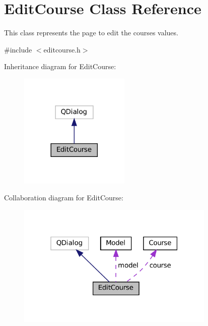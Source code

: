 \hypertarget{classEditCourse}{}\section{Edit\+Course Class Reference}
\label{classEditCourse}


This class represents the page to edit the course\textquotesingle{}s values.  




{\ttfamily \#include $<$editcourse.\+h$>$}



Inheritance diagram for Edit\+Course\+:\nopagebreak
\begin{figure}[H]
\begin{center}
\leavevmode
\includegraphics[width=149pt]{classEditCourse__inherit__graph}
\end{center}
\end{figure}


Collaboration diagram for Edit\+Course\+:\nopagebreak
\begin{figure}[H]
\begin{center}
\leavevmode
\includegraphics[width=268pt]{classEditCourse__coll__graph}
\end{center}
\end{figure}
